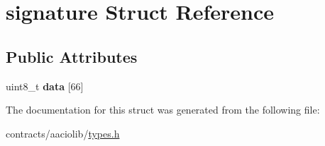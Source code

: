 \hypertarget{structsignature}{}\section{signature Struct Reference}
\label{structsignature}
\subsection*{Public Attributes}
\begin{DoxyCompactItemize}
\item 
\mbox{\label{structsignature_a7a290e4e75c5f2be1c432c8149f7bbc7}} 
uint8\+\_\+t {\bfseries data} \mbox{[}66\mbox{]}
\end{DoxyCompactItemize}


The documentation for this struct was generated from the following file\+:\begin{DoxyCompactItemize}
\item 
contracts/aaciolib/\mbox{\hyperlink{contracts_2aaciolib_2types_8h}{types.\+h}}\end{DoxyCompactItemize}
